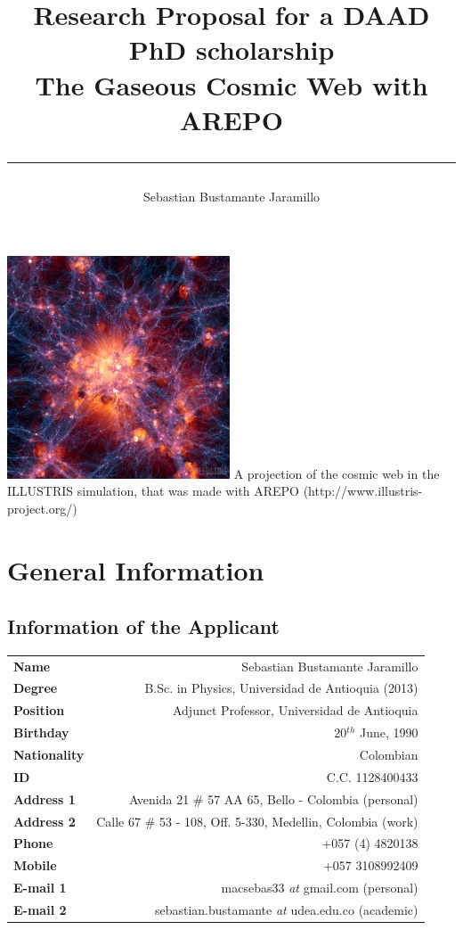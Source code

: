 \documentclass[a4,useAMS,usenatbib,usegraphicx,12pt]{article}
\title{{\textbf{Research Proposal for a DAAD PhD scholarship}}\\ 
				The Gaseous Cosmic Web with AREPO\\ 
				\color{black}\rule{15cm}{0.5mm}}
\author{Sebastian Bustamante Jaramillo}
\date{}
\begin{document}
\maketitle
\begin{center}
\includegraphics[trim = 0mm 3.5cm 0mm 3.0cm, clip, keepaspectratio=true,
width=0.7\textheight]{Presentation1.png}
\tiny{A projection of the cosmic web in the ILLUSTRIS simulation, that was made
with AREPO (http://www.illustris-project.org/)}
\end{center}
\tableofcontents
 
\newpage 

\section{General Information}
\small
\subsection*{Information of the Applicant}
\begin{tabular}{L!{\VRule}R}
\bf Name		& Sebastian Bustamante Jaramillo\\
\bf Degree		& B.Sc. in Physics, Universidad de Antioquia (2013)\\
\bf Position	& Adjunct Professor, Universidad de Antioquia\\
\bf Birthday	& { 20$^{th}$ June, 1990}\\
\bf Nationality & Colombian\\
\bf ID			& C.C. 1128400433\\
\bf Address 1	& Avenida 21 \# 57 AA 65, Bello - Colombia (personal)\\
\bf Address 2	& Calle 67 \# 53 - 108, Off. 5-330, Medellin, Colombia (work)\\
\bf Phone		& +057 (4) 4820138\\
\bf Mobile		& +057 3108992409\\
\bf E-mail 1	& macsebas33 \textit{at} gmail.com (personal)\\
\bf E-mail 2	& sebastian.bustamante \textit{at} udea.edu.co (academic)\\
\end{tabular}
\end{document}
